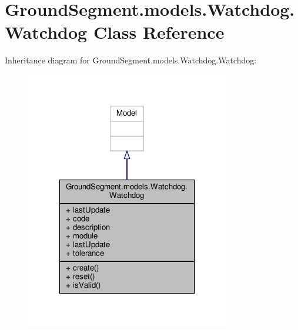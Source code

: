 \hypertarget{class_ground_segment_1_1models_1_1_watchdog_1_1_watchdog}{}\section{Ground\+Segment.\+models.\+Watchdog.\+Watchdog Class Reference}
\label{class_ground_segment_1_1models_1_1_watchdog_1_1_watchdog}


Inheritance diagram for Ground\+Segment.\+models.\+Watchdog.\+Watchdog\+:\nopagebreak
\begin{figure}[H]
\begin{center}
\leavevmode
\includegraphics[width=252pt]{class_ground_segment_1_1models_1_1_watchdog_1_1_watchdog__inherit__graph}
\end{center}
\end{figure}


